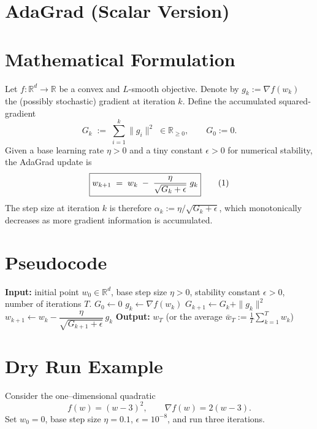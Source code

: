 \documentclass[11pt]{article}
\newcommand{\R}{\mathbb{R}}
\begin{document}
\section*{AdaGrad (Scalar Version)}

\section*{Mathematical Formulation}
Let $f:\R^d\rightarrow\R$ be a convex and $L$-smooth objective.  
Denote by $g_k:=\nabla f(w_k)$ the (possibly stochastic) gradient at iteration $k$.
Define the accumulated squared‐gradient
\[
G_k \;:=\; \sum_{i=1}^{k} \|g_i\|^{2}\;\in\R_{\ge 0},
\qquad G_0:=0 .
\]
Given a base learning rate $\eta>0$ and a tiny constant $\epsilon>0$ for numerical stability, the AdaGrad update is
\[
\boxed{%
w_{k+1}\;=\;w_k\;-\;\frac{\eta}{\sqrt{G_k+\epsilon}}\;g_k
}
\tag{1}
\]
The step size at iteration $k$ is therefore $\alpha_k:=\eta/ \sqrt{G_k+\epsilon}$, which monotonically decreases as more gradient information is accumulated.

\section*{Pseudocode}
\begin{algorithm}[H]
\caption{AdaGrad (Scalar)}\label{alg:adagrad}
\begin{algorithmic}[1]
\State \textbf{Input:} initial point $w_0\in\R^d$, base step size $\eta>0$, stability constant $\epsilon>0$, number of iterations $T$.
\State $G_0 \gets 0$
    \State $g_k \gets \nabla f(w_k)$ 
    \State $G_{k+1} \gets G_k + \|g_k\|^{2}$
    \State $w_{k+1} \gets w_k - \dfrac{\eta}{\sqrt{G_{k+1}+\epsilon}}\,g_k$
\EndFor
\State \textbf{Output:} $w_T$ (or the average $\bar w_T:=\frac1T\sum_{k=1}^T w_k$)
\end{algorithmic}
\end{algorithm}

\section*{Dry Run Example}
Consider the one–dimensional quadratic
\[
f(w) = (w-3)^2,\qquad \nabla f(w)=2(w-3).
\]
Set $w_0=0$, base step size $\eta=0.1$, $\epsilon=10^{-8}$, and run three iterations.
\end{document}
